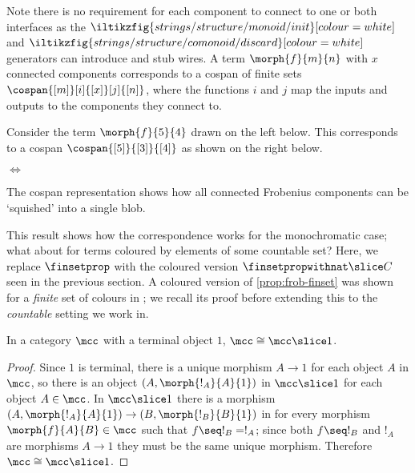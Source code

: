 \begin{center}
\end{center}

Note there is no requirement for each component to connect to one or both
interfaces as the \(
    \iltikzfig{strings/structure/monoid/init}[colour=white]
\) and \(
    \iltikzfig{strings/structure/comonoid/discard}[colour=white]
\) generators can introduce and stub wires.
A term \(\morph{f}{m}{n}\) with \(x\) connected components corresponds to
a cospan of finite sets \(\cospan{[m]}[i]{[x]}[j]{[n]}\), where the functions
\(i\) and \(j\) map the inputs and outputs to the components they connect to.

\begin{example}
    Consider the term \(\morph{f}{5}{4}\) drawn on the left below.
    This corresponds to a cospan \(\cospan{[5]}{[3]}{[4]}\) as shown on the
    right below.
    \begin{center}
        \(\Leftrightarrow\)
    \end{center}
\end{example}

The cospan representation shows how all connected Frobenius components can be
`squished' into a single blob.

This result shows how the correspondence works for the monochromatic case; what
about for terms coloured by elements of some countable set?
Here, we replace \(\finsetprop\) with the coloured version
\(\finsetpropwithnat \slice C\) seen in the previous section.
A coloured version of \cref{prop:frob-finset} was shown for a \emph{finite} set
of colours in \cite{bonchi2022string}; we recall its proof before extending this
to the \emph{countable} setting we work in.

\begin{lemma}
    \label{lem:slice-iso-terminal}
    In a category \(\mcc\) with a terminal object \(1\),
    \(\mcc \cong \mcc \slice 1\).
\end{lemma}
\begin{proof}
    Since \(1\) is terminal, there is a unique morphism \(A \to 1\) for each
    object \(A\) in \(\mcc\), so there is an object \((A, \morph{!_A}{A}{1})\)
    in \(\mcc \slice 1\) for each object \(A \in \mcc\).
    In \(\mcc \slice 1\) there is a morphism
    \((A, \morph{!_A}{A}{1}) \to (B, \morph{!_B}{B}{1})\) in
    for every morphism \(\morph{f}{A}{B} \in \mcc\) such
    that \(f \seq !_B = !_A\); since both \(f \seq !_B\) and \(!_A\) are
    morphisms \(A \to 1\) they must be the same unique morphism.
    Therefore \(\mcc \cong \mcc \slice 1\).
\end{proof}


